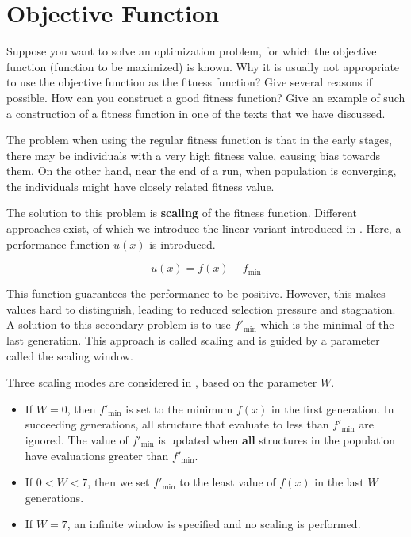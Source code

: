 \documentclass[../main.tex]{subfiles}
\begin{document}
\section{Objective Function}
\begin{question}
Suppose you want to solve an optimization problem, for which the objective function (function to be maximized) is
known. Why it is usually not appropriate to use the objective function as the fitness function? Give several reasons if
possible. How can you construct a good fitness function? Give an example of such a construction of a fitness function
in one of the texts that we have discussed.
\end{question}
\begin{solution}
The problem when using the regular fitness function is that in the early stages, there may be individuals with a very
high fitness value, causing bias towards them. On the other hand, near the end of a run, when population is converging,
the individuals might have closely related fitness value.

The solution to this problem is \textbf{scaling} of the fitness function. Different approaches exist, of which we
introduce the linear variant introduced in \cite{4075583}. Here, a performance function $u(x)$ is introduced.

\begin{equation}
    u(x) = f(x) - f_\text{min}
\end{equation}

This function guarantees the performance to be positive. However, this makes values hard to distinguish, leading
to reduced selection pressure and stagnation. A solution to this secondary problem is to use $f'_\text{min}$ which is the minimal of the last generation. This approach is called scaling and is guided by a parameter called the scaling window.

Three scaling modes are considered in \cite{4075583}, based on the parameter $W$.
\begin{itemize}
    \item If $W = 0$, then $f'_{\text{min}}$ is set to the minimum $f(x)$ in the first generation. In succeeding
    generations, all structure that evaluate to less than $f'_{\text{min}}$  are ignored. The value of
    $f'_{\text{min}}$ is updated when \textbf{all} structures in the population have evaluations greater than
    $f'_{\text{min}}$.
    \item If $0 < W < 7$, then we set $f'_{\text{min}}$ to the least value of $f(x)$ in the last $W$ generations.
    \item If $W = 7$, an infinite window is specified and no scaling is performed.
\end{itemize}
\end{solution}
\end{document}
